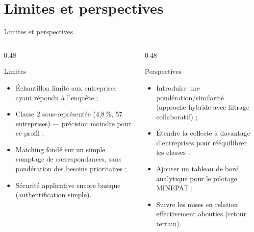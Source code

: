 \documentclass[aspectratio=169, 10pt]{beamer}
\begin{document}
\section{Limites et perspectives}

\begin{frame}{Limites et perspectives}
    \begin{columns}[T]
        \begin{column}{0.48\textwidth}
            \begin{alertblock}{Limites}
                \begin{itemize}
                    \item Échantillon limité aux entreprises ayant répondu à l'enquête ;
                    \item Classe 2 sous-représentée (4,8\,\%, 57 entreprises) — précision moindre pour ce profil ;
                    \item Matching fondé sur un simple comptage de correspondances, sans pondération des besoins prioritaires ;
                    \item Sécurité applicative encore basique (authentification simple).
                \end{itemize}
            \end{alertblock}
        \end{column}
        \begin{column}{0.48\textwidth}
            \begin{exampleblock}{Perspectives}
                \begin{itemize}
                    \item Introduire une pondération/similarité (approche hybride avec filtrage collaboratif) ;
                    \item Étendre la collecte à davantage d'entreprises pour rééquilibrer les classes ;
                    \item Ajouter un tableau de bord analytique pour le pilotage MINEPAT ;
                    \item Suivre les mises en relation effectivement abouties (retour terrain).
                \end{itemize}
            \end{exampleblock}
        \end{column}
    \end{columns}
\end{frame}
\end{document}
